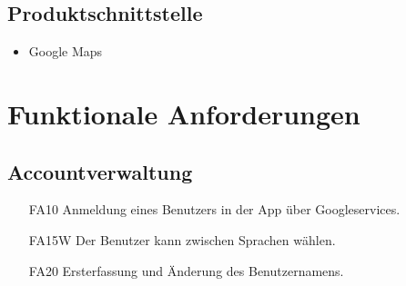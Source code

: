 \documentclass{scrartcl}
\begin{document}
	\subsection{Produktschnittstelle}
	\begin{itemize}	        
		\item Google Maps
	\end{itemize}
	\newpage
	
	
	\section{Funktionale Anforderungen}
	
	
	\subsection{Accountverwaltung}
	\begin{itemize}
		\item[FA10] Anmeldung eines Benutzers in der App über Googleservices.
		\item[FA15W] Der Benutzer kann zwischen Sprachen wählen.
		\item[FA20] Ersterfassung und Änderung des Benutzernamens.
		
	\end{itemize}
	
\end{document}
